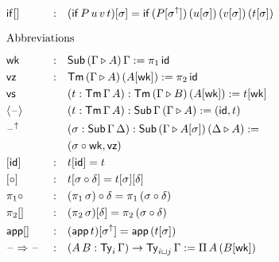\documentclass{article}
\begin{document}
\begin{multicols}{3}
\begin{alignat*}{5}
  & {\IF[]} && : && (\IF\,P\,u\,v\,t)[\sigma] = \IF\,(P[\sigma^\uparrow])\,(u[\sigma])\,(v[\sigma])\,(t[\sigma]) \\
  & \heading{Abbreviations} \\
  & \wk && : && \Tms\,(\Gamma\ext A)\,\Gamma := \pi_1\,\id \\
  & \vz && : && \Tm\,(\Gamma\ext A)\,(A[\wk]) := \pi_2\,\id \\
  & \vs && && (t:\Tm\,\Gamma\,A):\Tm\,(\Gamma\ext B)\,(A[\wk]) := t[\wk] \\
  & \lb\blank\rb && && (t:\Tm\,\Gamma\,A):\Tms\,\Gamma\,(\Gamma\ext A) := (\id, t) \\
  & \blank^\uparrow && && (\sigma:\Tms\,\Gamma\,\Delta):\Tms\,(\Gamma\ext A[\sigma])\,(\Delta\ext A) := \\
  & && && (\sigma\circ\wk, \vz) \\
  & [\id] && : && t[\id] = t \\
  & [\circ] && : && t[\sigma\circ\delta] = t[\sigma][\delta] \\
  & {\pi_1\circ} && : && (\pi_1\,\sigma)\circ\delta = \pi_1\,(\sigma\circ\delta) \\
  & {\pi_2[]} && : && (\pi_2\,\sigma)[\delta] = \pi_2\,(\sigma\circ\delta) \\
  & {\app[]} && : && (\app\,t)[\sigma^\uparrow] = \app\,(t[\sigma]) \\
  & \blank\Ra\blank && : && (A\,B:\Ty_i\,\Gamma)\ra\Ty_{\max{i}{j}}\,\Gamma := \Pi\,A\,(B[\wk]) \\

\end{alignat*}
\end{multicols}
\end{document}
